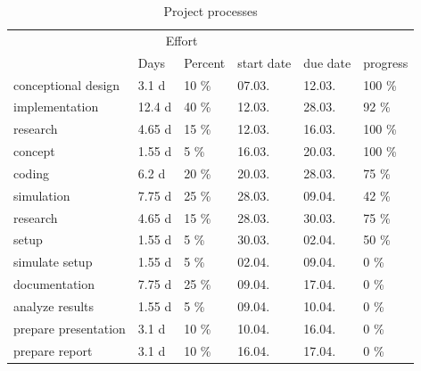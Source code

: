 \documentclass[a4paper,10pt]{article}
\begin{document}
\begin{table}[h]
\centering
\caption{Project processes}
\label{tab:project_processes}
\begin{tabular}{llllll}
\rowcolor[HTML]{EFEFEF} 
\cellcolor[HTML]{EFEFEF}                          & \multicolumn{2}{c}{\cellcolor[HTML]{EFEFEF}Effort} & \cellcolor[HTML]{EFEFEF}                             & \cellcolor[HTML]{EFEFEF}             &      \\
\rowcolor[HTML]{EFEFEF} 
\multirow{-2}{*}{\cellcolor[HTML]{EFEFEF}Process} & Days                  & Percent                   & \multirow{-2}{*}{\cellcolor[HTML]{EFEFEF}start date} & \multirow{-2}{*}{\cellcolor[HTML]{EFEFEF}due date} & \multirow{-2}{*}{\cellcolor[HTML]{EFEFEF}progress} \\
conceptional design                               & 3.1 d   & 10 \%  & 07.03. & 12.03. & 100 \% \\
implementation                                    & 12.4 d  & 40 \%  & 12.03. & 28.03. & 92 \% \\
\hspace{0.5cm}research                            & 4.65 d  & 15 \%  & 12.03. & 16.03. & 100 \% \\
\hspace{0.5cm}concept                             & 1.55 d  & 5 \%   & 16.03. & 20.03. & 100 \% \\
\hspace{0.5cm}coding                              & 6.2 d   & 20 \%  & 20.03. & 28.03. & 75 \% \\
simulation                                        & 7.75 d  & 25 \%  & 28.03. & 09.04. & 42 \% \\
\hspace{0.5cm}research                            & 4.65 d  & 15 \%  & 28.03. & 30.03. & 75 \% \\
\hspace{0.5cm}setup                               & 1.55 d  & 5 \%   & 30.03. & 02.04. & 50 \% \\
\hspace{0.5cm}simulate setup                      & 1.55 d  & 5 \%   & 02.04. & 09.04. & 0 \% \\
documentation                                     & 7.75 d  & 25 \%  & 09.04. & 17.04. & 0 \% \\
\hspace{0.5cm}analyze results                     & 1.55 d  & 5 \%   & 09.04. & 10.04. & 0 \% \\
\hspace{0.5cm}prepare presentation                & 3.1 d   & 10 \%  & 10.04. & 16.04. & 0 \% \\
\hspace{0.5cm}prepare report                      & 3.1 d   & 10 \%  & 16.04. & 17.04. & 0 \% \\
\end{tabular}
\end{table}
\end{document}
